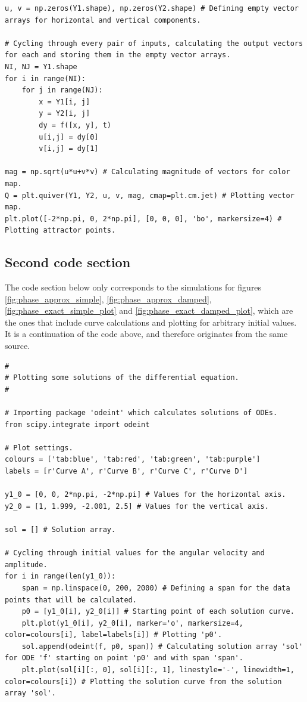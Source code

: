 \documentclass[12pt, a4paper, titlepage]{article}
\theoremstyle{definition}
\numberwithin{equation}{section}
\theoremstyle{definition}
\theoremstyle{definition}
\begin{document}
\begin{appendices}
\begin{lstlisting}
u, v = np.zeros(Y1.shape), np.zeros(Y2.shape) # Defining empty vector arrays for horizontal and vertical components.

# Cycling through every pair of inputs, calculating the output vectors for each and storing them in the empty vector arrays.
NI, NJ = Y1.shape 
for i in range(NI):
    for j in range(NJ):
        x = Y1[i, j]
        y = Y2[i, j]
        dy = f([x, y], t)
        u[i,j] = dy[0]
        v[i,j] = dy[1]

mag = np.sqrt(u*u+v*v) # Calculating magnitude of vectors for color map.
Q = plt.quiver(Y1, Y2, u, v, mag, cmap=plt.cm.jet) # Plotting vector map.
plt.plot([-2*np.pi, 0, 2*np.pi], [0, 0, 0], 'bo', markersize=4) # Plotting attractor points.
\end{lstlisting}

\subsection{Second code section}
The code section below only corresponds to the simulations for figures \ref{fig:phase_approx_simple}, \ref{fig:phase_approx_damped}, \ref{fig:phase_exact_simple_plot} and \ref{fig:phase_exact_damped_plot}, which are the ones that include curve calculations and plotting for arbitrary initial values. It is a continuation of the code above, and therefore originates from the same source. \parencite{kitchen}

\begin{lstlisting}[firstnumber=51]
#
# Plotting some solutions of the differential equation.
#

# Importing package 'odeint' which calculates solutions of ODEs.
from scipy.integrate import odeint

# Plot settings.
colours = ['tab:blue', 'tab:red', 'tab:green', 'tab:purple']
labels = [r'Curve A', r'Curve B', r'Curve C', r'Curve D']

y1_0 = [0, 0, 2*np.pi, -2*np.pi] # Values for the horizontal axis.
y2_0 = [1, 1.999, -2.001, 2.5] # Values for the vertical axis.

sol = [] # Solution array.

# Cycling through initial values for the angular velocity and amplitude.
for i in range(len(y1_0)):
    span = np.linspace(0, 200, 2000) # Defining a span for the data points that will be calculated.
    p0 = [y1_0[i], y2_0[i]] # Starting point of each solution curve.
    plt.plot(y1_0[i], y2_0[i], marker='o', markersize=4, color=colours[i], label=labels[i]) # Plotting 'p0'.
    sol.append(odeint(f, p0, span)) # Calculating solution array 'sol' for ODE 'f' starting on point 'p0' and with span 'span'.
    plt.plot(sol[i][:, 0], sol[i][:, 1], linestyle='-', linewidth=1, color=colours[i]) # Plotting the solution curve from the solution array 'sol'.
    

\end{lstlisting}
\end{appendices}
\end{document}
